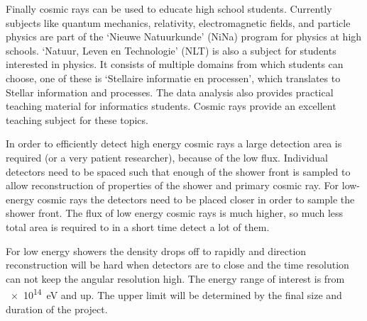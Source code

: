 Finally cosmic rays can be used to educate high school students. Currently subjects like quantum mechanics, relativity, electromagnetic fields, and particle physics are part of the `Nieuwe Natuurkunde' (NiNa) program for physics at high schools. `Natuur, Leven en Technologie' (NLT) is also a subject for students interested in physics. It consists of multiple domains from which students can choose, one of these is `Stellaire informatie en processen', which translates to Stellar information and processes. The data analysis also provides practical teaching material for informatics students. Cosmic rays provide an excellent teaching subject for these topics.

In order to efficiently detect high energy cosmic rays a large detection area is required (or a very patient researcher), because of the low flux. Individual detectors need to be spaced such that enough of the shower front is sampled to allow reconstruction of properties of the shower and primary cosmic ray. For low-energy cosmic rays the detectors need to be placed closer in order to sample the shower front. The flux of low energy cosmic rays is much higher, so much less total area is required to in a short time detect a lot of them.

For low energy showers the density drops off to rapidly and direction reconstruction will be hard when detectors are to close and the time resolution can not keep the angular resolution high. The energy range of interest is from \SI{e14}{\eV} and up. The upper limit will be determined by the final size and duration of the project.

